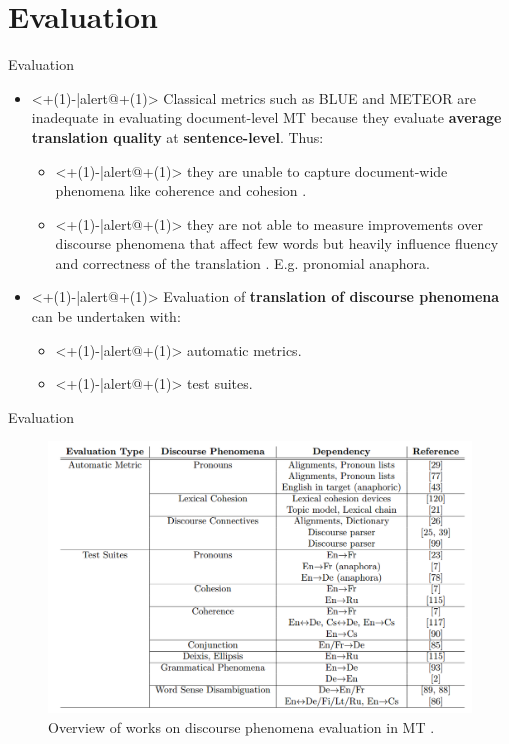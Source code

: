 \section{Evaluation}

\begin{frame}{Evaluation}	
	\begin{itemize}
		\item<+(1)-|alert@+(1)> Classical metrics such as BLUE and METEOR are inadequate in evaluating document-level MT because they evaluate \textbf{average translation quality} at \textbf{sentence-level}. Thus:
		\begin{itemize}
			\item<+(1)-|alert@+(1)> they are unable to capture document-wide phenomena like coherence and cohesion \cite{wong_extending_2012}.
			\item<+(1)-|alert@+(1)> they are not able to measure improvements over discourse phenomena that affect few words but heavily influence fluency and correctness of the translation \cite{muller_large-scale_2018}. E.g. pronomial anaphora.
		\end{itemize}
		\item<+(1)-|alert@+(1)> Evaluation of \textbf{translation of discourse phenomena} can be undertaken with:
			\begin{itemize}
				\item<+(1)-|alert@+(1)> automatic metrics.
				\item<+(1)-|alert@+(1)> test suites.
			\end{itemize}
	\end{itemize}
\end{frame}

\begin{frame}{Evaluation}	
	\begin{figure}
		\centering
		\includegraphics[width=0.7\linewidth]{Images/maruf_2019_discourse_phenomena}
		\caption{Overview of works on discourse phenomena evaluation in MT \cite{maruf_survey_2019}.}
			\label{fig:maruf2019discoursephenomena}
	\end{figure}	
\end{frame}

